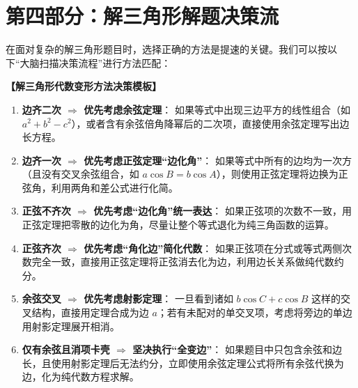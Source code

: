 \documentclass[11pt, a4paper]{ctexart}
\begin{document}
\section{第四部分：解三角形解题决策流}

在面对复杂的解三角形题目时，选择正确的方法是提速的关键。我们可以按以下“大脑扫描决策流程”进行方法匹配：

\begin{center}
\begin{tcolorbox}[colback=white, colframe=black, boxrule=0.5pt, arc=0pt, left=8pt, right=8pt, top=8pt, bottom=8pt]
\textbf{【解三角形代数变形方法决策模板】}
\begin{enumerate}[label=\arabic*. , leftmargin=2em, itemsep=0.8em]
  \item \textbf{边齐二次 $\Rightarrow$ 优先考虑余弦定理}：
    如果等式中出现三边平方的线性组合（如 $a^2+b^2-c^2$），或者含有余弦倍角降幂后的二次项，直接使用余弦定理写出边长方程。
  \item \textbf{边齐一次 $\Rightarrow$ 优先考虑正弦定理“边化角”}：
    如果等式中所有的边均为一次方（且没有交叉余弦组合，如 $a\cos B = b\cos A$），则使用正弦定理将边换为正弦角，利用两角和差公式进行化简。
  \item \textbf{正弦不齐次 $\Rightarrow$ 优先考虑“边化角”统一表达}：
    如果正弦项的次数不一致，用正弦定理把零散的边化为角，尽量让整个等式退化为纯三角函数的运算。
  \item \textbf{正弦齐次 $\Rightarrow$ 优先考虑“角化边”简化代数}：
    如果正弦项在分式或等式两侧次数完全一致，直接用正弦定理将正弦消去化为边，利用边长关系做纯代数约分。
  \item \textbf{余弦交叉 $\Rightarrow$ 优先考虑射影定理}：
    一旦看到诸如 $b\cos C + c\cos B$ 这样的交叉结构，直接用定理合成为边 $a$；若有未配对的单交叉项，考虑将旁边的单边用射影定理展开相消。
  \item \textbf{仅有余弦且消项卡壳 $\Rightarrow$ 坚决执行“全变边”}：
    如果题目中只包含余弦和边长，且使用射影定理后无法约分，立即使用余弦定理公式将所有余弦代换为边，化为纯代数方程求解。
\end{enumerate}
\end{tcolorbox}
\end{center}
\end{document}
